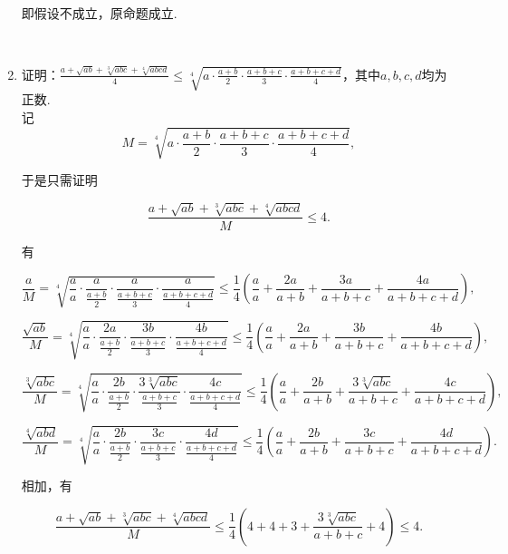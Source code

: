 \documentclass[8pt]{article}
\begin{document}
\begin{enumerate}
			即假设不成立，原命题成立.

		~\\

		\item 证明：$\displaystyle \frac{a+\sqrt{ab}+\sqrt[3]{abc}+\sqrt[4]{abcd}}{4}\leq\sqrt[4]{a\cdot\frac{a+b}{2}\cdot\frac{a+b+c}{3}\cdot\frac{a+b+c+d}{4}}$，其中$a, b, c, d$均为正数.
			~\\

			记
			$$M=\sqrt[4]{a\cdot\frac{a+b}{2}\cdot\frac{a+b+c}{3}\cdot\frac{a+b+c+d}{4}}, $$

			于是只需证明

			$$\frac{a+\sqrt{ab}+\sqrt[3]{abc}+\sqrt[4]{abcd}}{M}\leq 4.$$

			有

			$$
			\frac{a}{M}=\sqrt[4]{\frac{a}{a}\cdot\frac{a}{\frac{a+b}{2}}\cdot\frac{a}{\frac{a+b+c}{3}}\cdot\frac{a}{\frac{a+b+c+d}{4}}}\leq\frac{1}{4}\left(\frac{a}{a}+\frac{2a}{a+b}+\frac{3a}{a+b+c}+\frac{4a}{a+b+c+d}\right),
			$$

			$$
			\frac{\sqrt{ab}}{M}=\sqrt[4]{\frac{a}{a}\cdot\frac{2a}{\frac{a+b}{2}}\cdot\frac{3b}{\frac{a+b+c}{3}}\cdot\frac{4b}{\frac{a+b+c+d}{4}}}\leq\frac{1}{4}\left(\frac{a}{a}+\frac{2a}{a+b}+\frac{3b}{a+b+c}+\frac{4b}{a+b+c+d}\right),
			$$

			$$
			\frac{\sqrt[3]{abc}}{M}=\sqrt[4]{\frac{a}{a}\cdot\frac{2b}{\frac{a+b}{2}}\cdot\frac{3\sqrt[3]{abc}}{\frac{a+b+c}{3}}\cdot\frac{4c}{\frac{a+b+c+d}{4}}}\leq\frac{1}{4}\left(\frac{a}{a}+\frac{2b}{a+b}+\frac{3\sqrt[3]{abc}}{a+b+c}+\frac{4c}{a+b+c+d}\right),
			$$

			$$
			\frac{\sqrt[4]{abd}}{M}=\sqrt[4]{\frac{a}{a}\cdot\frac{2b}{\frac{a+b}{2}}\cdot\frac{3c}{\frac{a+b+c}{3}}\cdot\frac{4d}{\frac{a+b+c+d}{4}}}\leq\frac{1}{4}\left(\frac{a}{a}+\frac{2b}{a+b}+\frac{3c}{a+b+c}+\frac{4d}{a+b+c+d}\right).
			$$

			相加，有

			$$
			\frac{a+\sqrt{ab}+\sqrt[3]{abc}+\sqrt[4]{abcd}}{M} \leq \frac{1}{4} \left(4+4+3+\frac{3\sqrt[3]{abc}}{a+b+c}+4\right) \leq 4.
			$$

	\end{enumerate}
\end{document}
